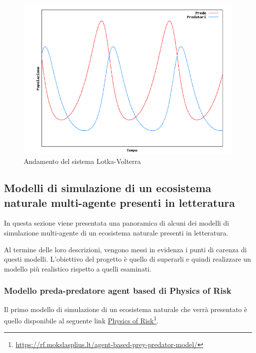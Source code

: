 \documentclass[11pt]{article}
\begin{document}
\begin{figure}[h]
    \centering
    \includegraphics[scale = 0.7]{risultatoLotkaVolterra.PNG}
    \caption{Andamento del sistema Lotka-Volterra}
    \label{fig:AndamentoLotkaVolterra}
\end{figure}


\subsection{Modelli di simulazione di un ecosistema naturale multi-agente presenti in letteratura}
In questa sezione viene presentata una panoramica di alcuni dei modelli di simulazione multi-agente di un ecosistema naturale presenti in letteratura.

Al termine delle loro descrizioni, vengono messi in evidenza i punti di carenza di questi modelli. L'obiettivo del progetto è quello di superarli e quindi realizzare un modello più realistico rispetto a quelli esaminati.

\subsubsection{Modello preda-predatore agent based di Physics of Risk}
Il primo modello di simulazione di un ecosistema naturale che verrà presentato è quello disponibile al seguente link \href{https://rf.mokslasplius.lt/agent-based-prey-predator-model/}{Physics of Risk}\footnote{\url{https://rf.mokslasplius.lt/agent-based-prey-predator-model/}}.
\end{document}

